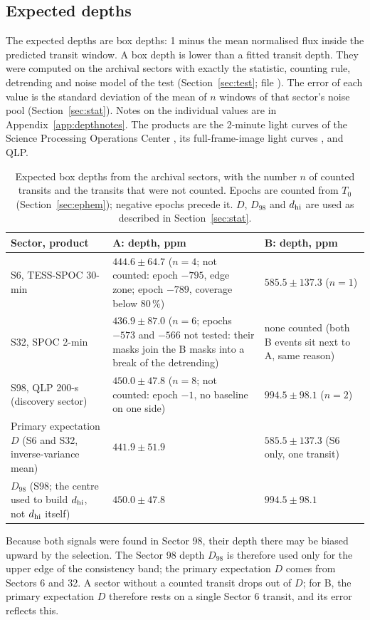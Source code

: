 \subsection{Expected depths} \label{sec:depths}

The expected depths are box depths: 1 minus the mean normalised flux inside the predicted transit window. A box depth
is lower than a fitted transit depth. They were computed on the archival sectors with exactly the statistic, counting
rule, detrending and noise model of the test (Section~\ref{sec:test}; file ). The error
of each value is the standard deviation of the mean of $n$ windows of that sector's noise pool (Section~\ref{sec:stat}). Notes on the individual
values are in Appendix~\ref{app:depthnotes}. The products are the 2-minute light curves of the Science Processing Operations
Center \citep[SPOC;][]{Jenkins2016}, its full-frame-image light curves \citep[TESS-SPOC;][]{Caldwell2020}, and QLP.

\begin{table}[ht]
\caption{Expected box depths from the archival sectors, with the number $n$ of counted transits and the transits that
were not counted. Epochs are counted from $T_0$ (Section~\ref{sec:ephem}); negative epochs precede it. $D$, $D_{98}$ and
$d_{\rm hi}$ are used as described in Section~\ref{sec:stat}.\label{tab:depths}}
\footnotesize
\setlength{\tabcolsep}{2pt}
\begin{tabular}{>{\raggedright\arraybackslash}p{}>{\raggedright\arraybackslash}p{}>{\raggedright\arraybackslash}p{}}
\toprule
Sector, product & A: depth, ppm & B: depth, ppm \\
\midrule
S6, TESS-SPOC 30-min & $444.6 \pm 64.7$ ($n = 4$; not counted: epoch $-795$, edge zone; epoch $-789$, coverage below
  80\,\%) & $585.5 \pm 137.3$ ($n = 1$) \\
S32, SPOC 2-min & $436.9 \pm 87.0$ ($n = 6$; epochs $-573$ and $-566$ not tested: their masks join the B masks into a
  break of the detrending) & none counted (both B events sit next to A, same reason) \\
S98, QLP 200-s (discovery sector) & $450.0 \pm 47.8$ ($n = 8$; not counted: epoch $-1$, no baseline on one side) &
  $994.5 \pm 98.1$ ($n = 2$) \\
\midrule
Primary expectation $D$ (S6 and S32, inverse-variance mean) & $441.9 \pm 51.9$ & $585.5 \pm 137.3$ (S6 only, one
  transit) \\
$D_{98}$ (S98; the centre used to build $d_{\rm hi}$, not $d_{\rm hi}$ itself) & $450.0 \pm 47.8$ & $994.5 \pm 98.1$ \\
\bottomrule
\end{tabular}
\end{table}

Because both signals were found in Sector 98, their depth there may be biased upward by the selection. The Sector 98
depth $D_{98}$ is therefore used only for the upper edge of the consistency band; the primary expectation $D$ comes from
Sectors 6 and 32. A sector without a counted transit drops out of $D$; for B, the primary expectation $D$ therefore
rests on a single Sector 6 transit, and its error reflects this.
